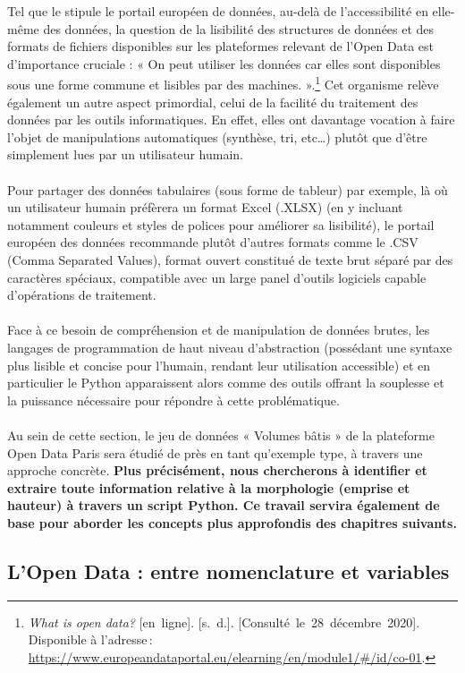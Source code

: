 \documentclass[
  11pt,
  french,
]{article}
\begin{document}
Tel que le stipule le portail européen de données, au-delà de
l'accessibilité en elle-même des données, la question de la lisibilité
des structures de données et des formats de fichiers disponibles sur les
plateformes relevant de l'Open Data est d'importance cruciale : « On
peut utiliser les données car elles sont disponibles sous une forme
commune et lisibles par des machines. ».\footnote{\emph{What is open
  data?} {[}en~ligne{]}. {[}s.~d.{]}.
  {[}Consulté~le~28~décembre~2020{]}. Disponible à l'adresse\,:
  \url{https://www.europeandataportal.eu/elearning/en/module1/\#/id/co-01}.}
Cet organisme relève également un autre aspect primordial, celui de la
facilité du traitement des données par les outils informatiques. En
effet, elles ont davantage vocation à faire l'objet de manipulations
automatiques (synthèse, tri, etc\ldots) plutôt que d'être simplement
lues par un utilisateur humain.\\
~\\
Pour partager des données tabulaires (sous forme de tableur) par
exemple, là où un utilisateur humain préfèrera un format Excel (.XLSX)
(en y incluant notamment couleurs et styles de polices pour améliorer sa
lisibilité), le portail européen des données recommande plutôt d'autres
formats comme le .CSV (Comma Separated Values), format ouvert constitué
de texte brut séparé par des caractères spéciaux, compatible avec un
large panel d'outils logiciels capable d'opérations de traitement.\\
~\\
Face à ce besoin de compréhension et de manipulation de données brutes,
les langages de programmation de haut niveau d'abstraction (possédant
une syntaxe plus lisible et concise pour l'humain, rendant leur
utilisation accessible) et en particulier le Python apparaissent alors
comme des outils offrant la souplesse et la puissance nécessaire pour
répondre à cette problématique.\\
~\\
Au sein de cette section, le jeu de données « Volumes bâtis » de la
plateforme Open Data Paris sera étudié de près en tant qu'exemple type,
à travers une approche concrète. \textbf{Plus précisément, nous
chercherons à identifier et extraire toute information relative à la
morphologie (emprise et hauteur) à travers un script Python. Ce travail
servira également de base pour aborder les concepts plus approfondis des
chapitres suivants.}

\newpage

\hypertarget{lopen-data-entre-nomenclature-et-variables}{%
\subsection{L'Open Data : entre nomenclature et
variables}\label{lopen-data-entre-nomenclature-et-variables}}
\end{document}
